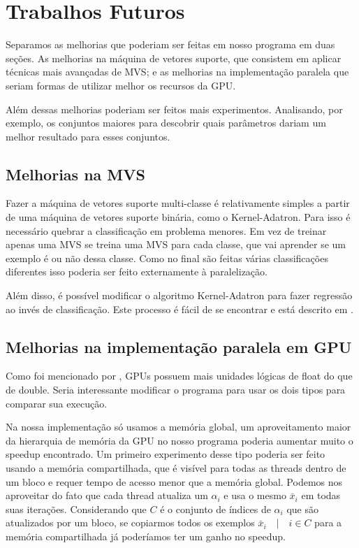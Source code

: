 \section{Trabalhos Futuros}

Separamos as melhorias que poderiam ser feitas em nosso programa em duas seções. As melhorias na máquina de vetores suporte, que consistem em aplicar técnicas mais avançadas de MVS; %
e as melhorias na implementação paralela que seriam formas de utilizar melhor os recursos da GPU.

Além dessas melhorias poderiam ser feitos mais experimentos. Analisando, por exemplo, os conjuntos maiores para descobrir quais parâmetros dariam um melhor resultado para esses conjuntos.


\subsection{Melhorias na MVS}

Fazer a máquina de vetores suporte multi-classe é relativamente simples a partir de uma máquina de vetores suporte binária, como o Kernel-Adatron. Para isso é necessário quebrar a classificação em problema menores. Em vez de treinar apenas uma MVS se treina uma MVS para cada classe, que vai aprender se um exemplo é ou não dessa classe. Como no final são feitas várias classificações diferentes isso poderia ser feito externamente à paralelização.

Além disso, é possível modificar o algoritmo Kernel-Adatron para fazer regressão ao invés de classificação. Este processo é fácil de se encontrar e está descrito em \cite{art:LIVRO_KAA}.

\subsection{Melhorias na implementação paralela em GPU} \label{sec:melhoriasCuda}

Como foi mencionado por \cite{art:REF_ART_2}, GPUs possuem mais unidades lógicas de float do que de double. Seria interessante modificar o programa para usar os dois tipos para comparar sua execução.

Na nossa implementação só usamos a memória global, um aproveitamento maior da hierarquia de memória da GPU no nosso programa poderia aumentar muito o speedup encontrado. Um primeiro experimento desse tipo poderia ser feito usando a memória compartilhada, que é visível para todas as threads dentro de um bloco e requer tempo de acesso menor que a memória global. Podemos nos aproveitar do fato que cada thread atualiza um $\alpha_i$ e usa o mesmo $\bar{x}_i$ em todas suas iterações. Considerando que $C$ é o conjunto de índices de $\alpha_i$ que são atualizados por um bloco, se copiarmos todos os exemplos $\bar{x}_i\quad|\quad i\in C$ para a memória compartilhada já poderíamos ter um ganho no speedup.

